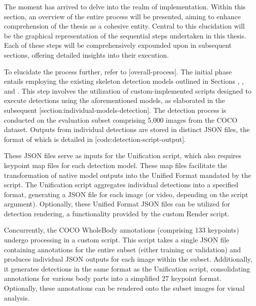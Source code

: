 
The moment has arrived to delve into the realm of implementation. Within this section, an overview of the entire process will be presented, aiming to enhance comprehension of the thesis as a cohesive entity. Central to this elucidation will be the graphical representation of the sequential steps undertaken in this thesis. Each of these steps will be comprehensively expounded upon in subsequent sections, offering detailed insights into their execution.

To elucidate the process further, refer to [overall-process]. The initial phase entails employing the existing skeleton detection models outlined in Sections , , and . This step involves the utilization of custom-implemented scripts designed to execute detections using the aforementioned models, as elaborated in the subsequent [section:individual-models-detection]. The detection process is conducted on the evaluation subset comprising 5,000 images from the COCO dataset. Outputs from individual detections are stored in distinct JSON files, the format of which is detailed in [code:detection-script-output].

These JSON files serve as inputs for the Unification script, which also requires keypoint map files for each detection model. These map files facilitate the transformation of native model outputs into the Unified Format mandated by the script. The Unification script aggregates individual detections into a specified format, generating a JSON file for each image (or video, depending on the script argument). Optionally, these Unified Format JSON files can be utilized for detection rendering, a functionality provided by the custom Render script.

Concurrently, the COCO WholeBody annotations (comprising 133 keypoints) undergo processing in a custom script. This script takes a single JSON file containing annotations for the entire subset (either training or validation) and produces individual JSON outputs for each image within the subset. Additionally, it generates detections in the same format as the Unification script, consolidating annotations for various body parts into a simplified 27 keypoint format. Optionally, these annotations can be rendered onto the subset images for visual analysis.

